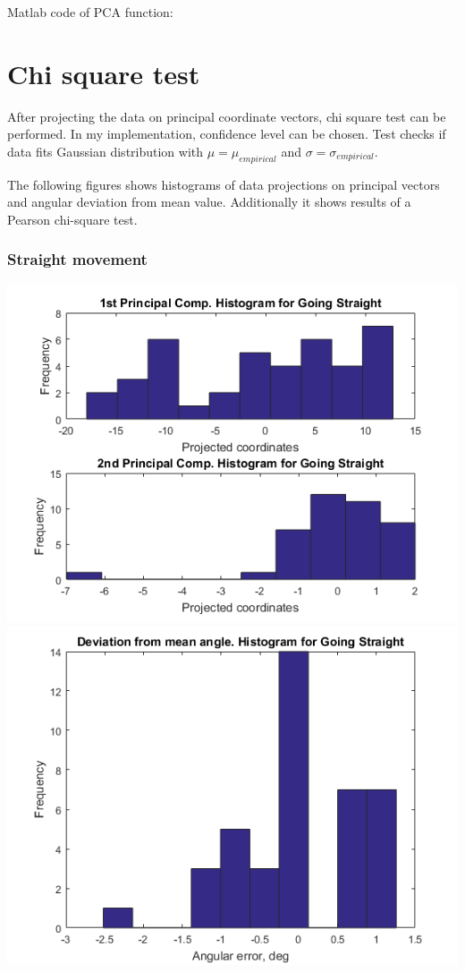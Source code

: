 \documentclass[a4paper, 12pt]{article}
\begin{document}
\newpage

Matlab code of PCA function:



\newpage
\section{Chi square test}
After projecting the data on principal coordinate vectors, chi square test can be performed. In my implementation, confidence level can be chosen. Test checks if data fits Gaussian distribution with $\mu = \mu_{empirical}$ and $\sigma = \sigma_{empirical}$.

The following figures shows histograms of data projections on principal vectors and angular deviation from mean value. Additionally it shows results of a Pearson chi-square test. 

\subsubsection{Straight movement}

\begin{center}
  \includegraphics[scale=0.6]{s2}
  \includegraphics[scale=0.6]{s3}
\end{center}
\end{document}
